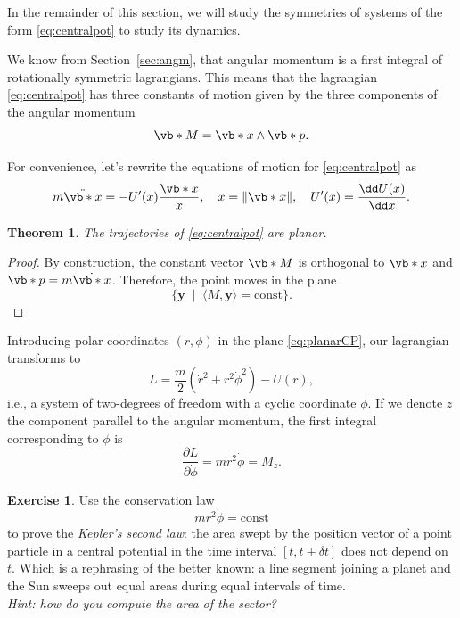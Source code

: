 \documentclass[english,fontsize=11pt,paper=b5]{scrbook}
\newtheorem{theorem}{Theorem}[chapter]
\theoremstyle{definition}
\newtheorem{exercise}{Exercise}[chapter]
\begin{document}
    In the remainder of this section, we will study the symmetries of systems of the form \eqref{eq:centralpot} to study its dynamics.

    We know from Section~\ref{sec:angm}, that angular momentum is a first integral of rotationally symmetric lagrangians.
    This means that the lagrangian \eqref{eq:centralpot} has three constants of motion given by the three components of the angular momentum
    \begin{equation}
      \vb*{M} = \vb*{x}\wedge \vb*{p}.
    \end{equation}

    For convenience, let's rewrite the equations of motion for \eqref{eq:centralpot} as
    \begin{equation}
      m\ddot{\vb*{x}} = - U'(x)\frac{\vb*{x}}{x}, \quad x = \|\vb*{x}\|, \quad U'(x)=\frac{\dd U(x)}{\dd x}.
    \end{equation}

    \begin{theorem}
      The trajectories of \eqref{eq:centralpot} are planar.
    \end{theorem}
    \begin{proof}
      By construction, the constant vector $\vb*{M}$ is orthogonal to $\vb*{x}$ and $\vb*{p} = m \dot{\vb*{x}}$.
      Therefore, the point moves in the plane
      \begin{equation}\label{eq:planarCP}
        \{\mathbf{y} \;\mid\; \langle M, \mathbf{y}\rangle = \mathrm{const} \}.
      \end{equation}
    \end{proof}

    Introducing polar coordinates $(r,\phi)$ in the plane \eqref{eq:planarCP}, our lagrangian transforms to
    \begin{equation}
      L = \frac{m}{2} \left(\dot r^2 + r^2 \dot \phi^2\right) - U(r),
    \end{equation}
    i.e., a system of two-degrees of freedom with a cyclic coordinate $\phi$.
    If we denote $z$ the component parallel to the angular momentum, the first integral corresponding to $\phi$ is
    \begin{equation}\label{eq:cyclicphi}
      \frac{\partial L}{\partial \dot \phi} = m r^2 \dot \phi = M_z.
    \end{equation}

    \begin{exercise}
      Use the conservation law
      \begin{equation}
        m r^2 \dot \phi = \mathrm{const}
      \end{equation}
      to prove the \emph{Kepler's second law}: the area swept by the position vector of a point particle in a central potential in the time interval $[t, t+\delta t]$ does not depend on $t$. Which is a rephrasing of the better known: a line segment joining a planet and the Sun sweeps out equal areas during equal intervals of time.\\
      \textit{Hint: how do you compute the area of the sector?}
    \end{exercise}
\end{document}
